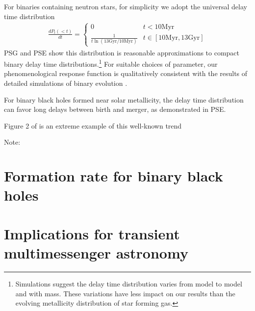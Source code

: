\documentclass[nofootinbib,twocolumn,prd]{emulateapj}
\newcommand\editremark[1]{{\color{red}#1}}
\newcommand\unit[1]{\text{#1}}
\newcommand\abbrvPSgrb{PSG}
\newcommand\abbrvPSellipticals{PSE}
\begin{document}
For binaries containing neutron stars, for simplicity we adopt the universal delay time distribution
\begin{eqnarray}
\frac{dP_t(<t)}{dt} =  \begin{cases}
0 & t<10 \unit{Myr} \\
\frac{1}{t \ln (13 \unit{Gyr}/10\unit{Myr})} & t \in [10\unit{Myr},13\unit{Gyr}]
\end{cases} 
\end{eqnarray}
\abbrvPSgrb{} and \abbrvPSellipticals{} show this distribution is reasonable approximations to compact binary delay
time distributions.\footnote{Simulations suggest the delay time distribution varies from model to model and with mass.
  These variations have less impact on our results than the evolving metallicity distribution of star forming gas.}
%
For suitable choices of parameter, our phenomenological response function is qualitatively consistent with the results of detailed simulations of binary
evolution  \citep{2010ApJ...715L.138B,popsyn-LowMetallicityImpact2c-StarTrackRevised-2014,popsyn-LowMetallicityImpact2b-StarTrackRevised-2013,popsyn-LowMetallicityImpact2-StarTrackRevised-2012}.


For binary black holes formed near solar metallicity, the delay time distribution can favor long delays between birth
and merger, as demonstrated in \abbrvPSellipticals{}.

Figure 2 of  \cite{2016arXiv160508783L} is an extreme example of this well-known trend

\editremark{Note}: 

\section{Formation rate for binary black holes}
\label{sec:results:BBH}



\section{Implications for transient multimessenger astronomy}
\end{document}

